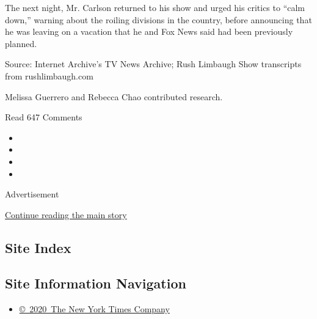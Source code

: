 The next night, Mr. Carlson returned to his show and urged his critics
to ``calm down,'' warning about the roiling divisions in the country,
before announcing that he was leaving on a vacation that he and Fox News
said had been previously planned.

Source: Internet Archive's TV News Archive; Rush Limbaugh Show
transcripts from rushlimbaugh.com

Melissa Guerrero and Rebecca Chao contributed research.

Read 647 Comments

\begin{itemize}
\item
\item
\item
\item
\end{itemize}

Advertisement

\protect\hyperlink{after-bottom}{Continue reading the main story}

\hypertarget{site-index}{%
\subsection{Site Index}\label{site-index}}

\hypertarget{site-information-navigation}{%
\subsection{Site Information
Navigation}\label{site-information-navigation}}

\begin{itemize}
\tightlist
\item
  \href{https://help.nytimes3xbfgragh.onion/hc/en-us/articles/115014792127-Copyright-notice}{©~2020~The
  New York Times Company}
\end{itemize}

